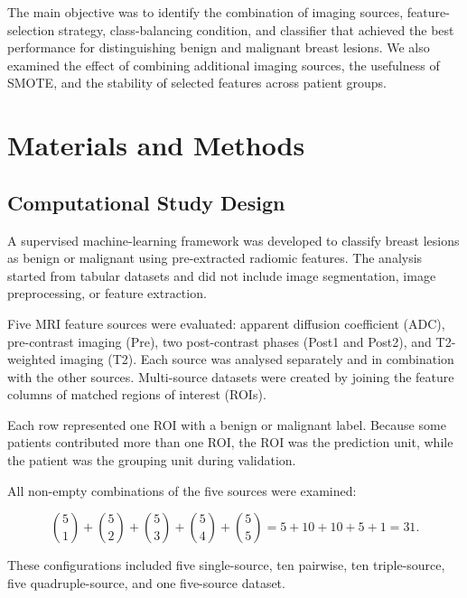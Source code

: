 \documentclass[12pt,twocolumn]{article}
\begin{document}
The main objective was to identify the combination of imaging sources,
feature-selection strategy, class-balancing condition, and classifier
that achieved the best performance for distinguishing benign and
malignant breast lesions. We also examined the effect of combining
additional imaging sources, the usefulness of SMOTE, and the stability
of selected features across patient groups.







\section{Materials and Methods}
\label{sec:materials_methods}

\subsection{Computational Study Design}
\label{subsec:computational_design}

A supervised machine-learning framework was developed to classify
breast lesions as benign or malignant using pre-extracted radiomic
features. The analysis started from tabular datasets and did not
include image segmentation, image preprocessing, or feature extraction.

Five MRI feature sources were evaluated: apparent diffusion coefficient
(ADC), pre-contrast imaging (Pre), two post-contrast phases (Post1 and
Post2), and T2-weighted imaging (T2). Each source was analysed
separately and in combination with the other sources. Multi-source
datasets were created by joining the feature columns of matched regions
of interest (ROIs).

Each row represented one ROI with a benign or malignant label. Because
some patients contributed more than one ROI, the ROI was the prediction
unit, while the patient was the grouping unit during validation.

All non-empty combinations of the five sources were examined:

\begin{equation}
\binom{5}{1}+\binom{5}{2}+\binom{5}{3}
+\binom{5}{4}+\binom{5}{5}
=5+10+10+5+1=31.
\label{eq:number_of_dataset_combinations}
\end{equation}

These configurations included five single-source, ten pairwise, ten
triple-source, five quadruple-source, and one five-source dataset.
\end{document}
